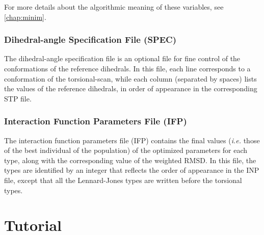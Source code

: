 \documentclass[10pt,a4paper,openany]{memoir}
\numberwithin{equation}{section}
\begin{document}
\noindent For more details about the algorithmic meaning of these variables, see \autoref{chap:minim}.

\subsection{Dihedral-angle Specification File (SPEC)}
\label{sec:file-formats-spec}

The dihedral-angle specification file is an optional file for fine
control of the conformations of the reference dihedrals. In this file,
each line corresponds to a conformation of the torsional-scan, while
each column (separated by spaces) lists the values of the reference
dihedrals, in order of appearance in the corresponding STP file.

\subsection{Interaction Function Parameters File (IFP)}
\label{sec:file-formats-IFP}

The interaction function parameters file (IFP) contains the final
values (\textit{i.e.} those of the best individual of the population)
of the optimized parameters for each type, along with the
corresponding value of the weighted RMSD. In this file, the types are
identified by an integer that reflects the order of appearance in the
INP file, except that all the Lennard-Jones types are written before
the torsional types.


\chapter{Tutorial}
\label{chap:tutorial}
 
\end{document}
